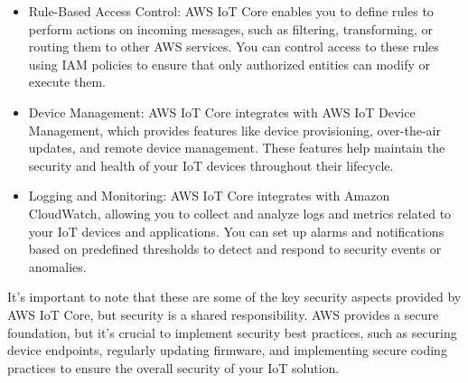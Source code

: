 \begin{itemize}
	\item Rule-Based Access Control: AWS IoT Core enables you to define rules to perform actions on incoming messages, such as filtering, transforming, or routing them to other AWS services. You can control access to these rules using IAM policies to ensure that only authorized entities can modify or execute them.
	
	\item Device Management: AWS IoT Core integrates with AWS IoT Device Management, which provides features like device provisioning, over-the-air updates, and remote device management. These features help maintain the security and health of your IoT devices throughout their lifecycle.
	
	\item Logging and Monitoring: AWS IoT Core integrates with Amazon CloudWatch, allowing you to collect and analyze logs and metrics related to your IoT devices and applications. You can set up alarms and notifications based on predefined thresholds to detect and respond to security events or anomalies.
\end{itemize}

It's important to note that these are some of the key security aspects provided by AWS IoT Core, but security is a shared responsibility. AWS provides a secure foundation, but it's crucial to implement security best practices, such as securing device endpoints, regularly updating firmware, and implementing secure coding practices to ensure the overall security of your IoT solution.